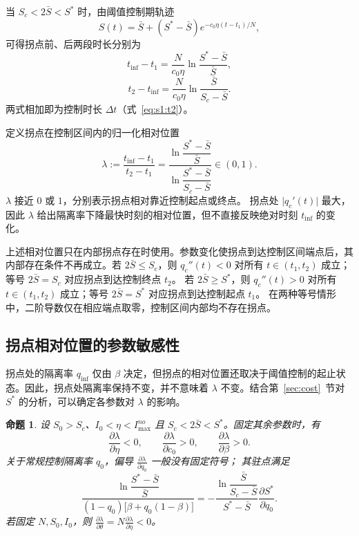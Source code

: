 \documentclass[UTF8,a4paper,10pt,fontset=fandol]{ctexart}
\theoremstyle{cnplain}
\newtheorem{proposition}[theorem]{命题}
\theoremstyle{remark}
\newcommand{\qinf}{q_{\mathrm{inf}}}
\numberwithin{equation}{section}
\begin{document}
当 $S_c<2\bar S<S^*$ 时，由阈值控制期轨迹
\[
S(t)=\bar S+(S^*-\bar S)e^{-c_0\eta(t-t_1)/N},
\]
可得拐点前、后两段时长分别为
\begin{equation}
t_{\mathrm{inf}}-t_1
=
\frac{N}{c_0\eta}
\ln\frac{S^*-\bar S}{\bar S},
\label{eq:s1:seg-high}
\end{equation}
\begin{equation}
t_2-t_{\mathrm{inf}}
=
\frac{N}{c_0\eta}
\ln\frac{\bar S}{S_c-\bar S}.
\label{eq:s1:seg-low}
\end{equation}
两式相加即为控制时长 $\Delta t$（式~\eqref{eq:s1:t2}）。

定义拐点在控制区间内的归一化相对位置
\begin{equation}
\lambda
:=
\frac{t_{\mathrm{inf}}-t_1}{t_2-t_1}
=
\frac{
\ln\dfrac{S^*-\bar S}{\bar S}
}{
\ln\dfrac{S^*-\bar S}{S_c-\bar S}
}
\in(0,1).
\label{eq:s1:lambda}
\end{equation}
$\lambda$ 接近 $0$ 或 $1$，分别表示拐点相对靠近控制起点或终点。
拐点处 $\lvert q_c'(t)\rvert$ 最大，因此 $\lambda$ 给出隔离率下降最快时刻的相对位置，但不直接反映绝对时刻 $t_{\mathrm{inf}}$ 的变化。

上述相对位置只在内部拐点存在时使用。参数变化使拐点到达控制区间端点后，其内部存在条件不再成立。若 $2\bar S\le S_c$，则 $q_c''(t)<0$ 对所有 $t\in(t_1,t_2)$ 成立；等号 $2\bar S=S_c$ 对应拐点到达控制终点 $t_2$。
若 $2\bar S\ge S^*$，则 $q_c''(t)>0$ 对所有 $t\in(t_1,t_2)$ 成立；等号 $2\bar S=S^*$ 对应拐点到达控制起点 $t_1$。
在两种等号情形中，二阶导数仅在相应端点取零，控制区间内部均不存在拐点。

\subsection{拐点相对位置的参数敏感性}
拐点处的隔离率 $\qinf$ 仅由 $\beta$ 决定，但拐点的相对位置还取决于阈值控制的起止状态。因此，拐点处隔离率保持不变，并不意味着 $\lambda$ 不变。结合第~\ref{sec:cost}~节对 $S^*$ 的分析，可以确定各参数对 $\lambda$ 的影响。

\begin{proposition}
\label{prop:s1:lambda-sensitivity}
设 $S_0>S_c$、$I_0<\eta<I_{\max}^{no}$ 且 $S_c<2\bar S<S^*$。固定其余参数时，有
\[
\frac{\partial \lambda}{\partial \eta}<0,
\qquad
\frac{\partial \lambda}{\partial c_0}>0,
\qquad
\frac{\partial \lambda}{\partial \beta}>0.
\]
关于常规控制隔离率 $q_0$，偏导 $\frac{\partial \lambda}{\partial q_0}$ 一般没有固定符号；
其驻点满足
\begin{equation}
\frac{
\ln\dfrac{S^*-\bar S}{\bar S}
}{
(1-q_0)\bigl[\beta+q_0(1-\beta)\bigr]
}
=
-
\frac{
\ln\dfrac{\bar S}{S_c-\bar S}
}{
S^*-\bar S
}
\frac{\partial S^*}{\partial q_0}.
\label{eq:s1:lambda-q0-stationary}
\end{equation}
若固定 $N,S_0,I_0$，则
$\frac{\partial \lambda}{\partial \theta}=N\frac{\partial \lambda}{\partial \eta}<0$。
\end{proposition}
\end{document}
